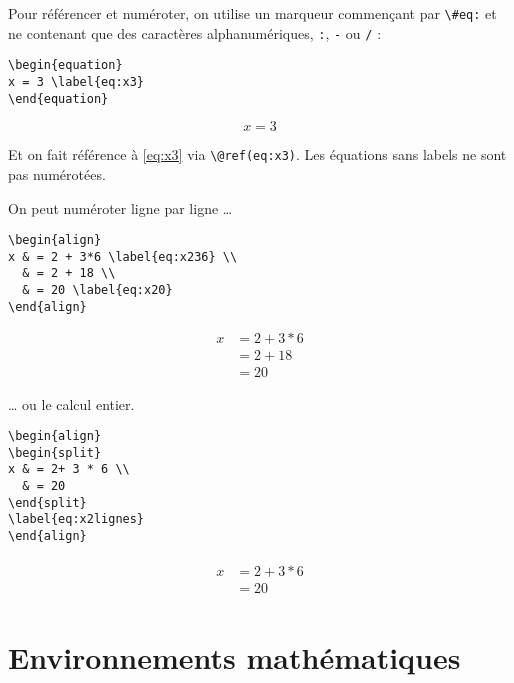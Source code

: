 \documentclass[]{book}
\theoremstyle{definition}
\theoremstyle{definition}
\theoremstyle{definition}
\theoremstyle{remark}
\begin{document}
Pour référencer et numéroter, on utilise un marqueur commençant par \texttt{\textbackslash{}\#eq:} et ne contenant que des caractères alphanumériques, \texttt{:}, \texttt{-} ou \texttt{/} :

\begin{verbatim}
\begin{equation}
x = 3 \label{eq:x3}
\end{equation}
\end{verbatim}

\begin{equation}
x = 3 \label{eq:x3}
\end{equation}

Et on fait référence à \eqref{eq:x3} via \texttt{\textbackslash{}@ref(eq:x3)}. Les équations sans labels ne sont pas numérotées.

On peut numéroter ligne par ligne \ldots{}

\begin{verbatim}
\begin{align}
x & = 2 + 3*6 \label{eq:x236} \\
  & = 2 + 18 \\
  & = 20 \label{eq:x20}
\end{align}
\end{verbatim}

\begin{align}
x & = 2 + 3*6 \label{eq:x236} \\
  & = 2 + 18 \\
  & = 20 \label{eq:x20}
\end{align}

\ldots{} ou le calcul entier.

\begin{verbatim}
\begin{align}
\begin{split}
x & = 2+ 3 * 6 \\
  & = 20
\end{split}
\label{eq:x2lignes}
\end{align}
\end{verbatim}

\begin{align}
\begin{split}
x & = 2+ 3 * 6 \\
  & = 20
\end{split}
\label{eq:x2lignes}
\end{align}

\hypertarget{environnements-mathematiques}{%
\section{Environnements mathématiques}\label{environnements-mathematiques}}
\end{document}
